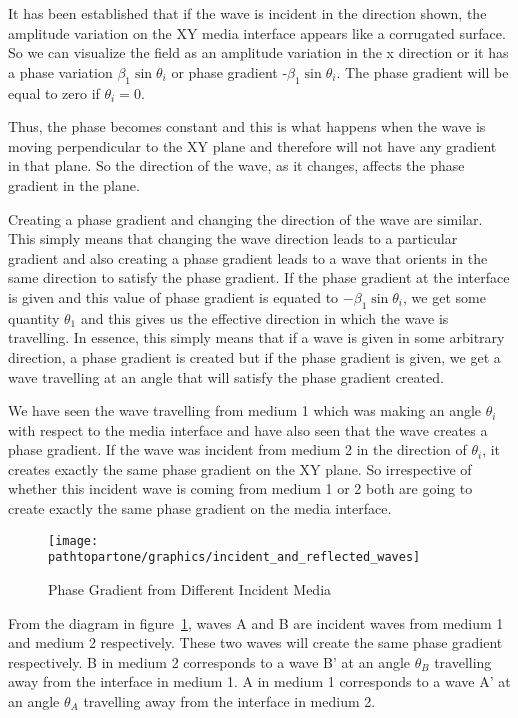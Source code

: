 It has been established that if the wave is incident in the direction shown, the amplitude variation on the XY media interface appears like a corrugated surface. So we can visualize the field as an amplitude variation in the x direction or it has a phase variation $\beta_1\sin \theta_i$ or phase gradient -$\beta_1\sin\theta_i$. The phase gradient will be equal to zero if $\theta_i=0$.

Thus, the phase becomes constant and this is what happens when the wave is moving perpendicular to the XY plane and therefore will not have any gradient in that plane. So the direction of the wave, as it changes, affects the phase gradient in the plane.

Creating a phase gradient and changing the direction of the wave are similar. This simply means that changing the wave direction leads to a particular gradient and also creating a phase gradient leads to a wave that orients in the same direction to satisfy the phase gradient. If the phase gradient at the interface is given and this value of phase gradient is equated to $-\beta_1 \sin \theta_i$, we get some quantity $\theta_1$ and this gives us the effective direction in which the wave is travelling. In essence, this simply means that if a wave is given in some arbitrary direction, a phase gradient is created but if the phase gradient is given, we get a wave travelling at an angle that will satisfy the phase gradient created.

We have seen the wave travelling from medium 1  which was making an angle $\theta_i$ with respect to the media interface and have also seen that the wave creates a phase gradient. If the wave was incident from medium 2 in the direction of $\theta_i$, it creates exactly the same phase gradient on the XY plane. So irrespective of whether this incident wave is coming from medium 1 or 2 both are going to create exactly the same phase gradient on the media interface.
\begin{figure}[h]
\centering
\texttt{[image: \\pathtopartone/graphics/incident\_and\_reflected\_waves]}
\caption{Phase Gradient from Different Incident Media}
\label{fig:group30d---copy}
\end{figure}

From the diagram in figure~\ref{fig:group30d---copy}, waves A and B are incident waves from medium 1 and medium 2 respectively. These two waves will create the same phase gradient respectively. B in medium 2 corresponds to a wave B'  at an angle $\theta_B$ travelling away from the interface in medium 1. A in medium 1 corresponds to a wave A' at an angle $\theta_A$ travelling away from the interface in medium 2.

